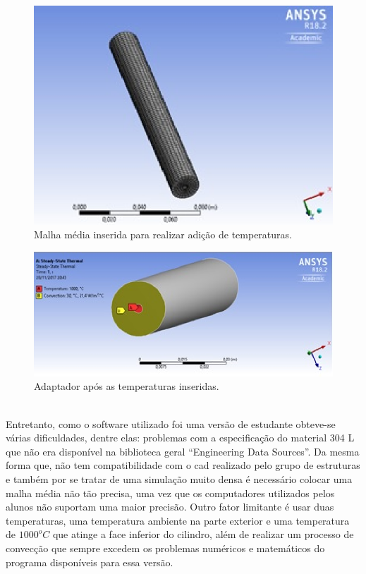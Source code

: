 \begin{figure}[!htb]                  
	\centering                          
	\includegraphics[scale=0.8]{figuras/Figura10tc.eps}
	\caption{Malha média inserida para realizar adição de temperaturas.} \label{fig10tc}              
\end{figure}
\begin{figure}[!htb]                  
	\centering                          
	\includegraphics[scale=0.8]{figuras/Figura11tc.eps}
	\caption{Adaptador após as temperaturas inseridas.} \label{fig11tc}              
\end{figure}
\\Entretanto,  como o software utilizado foi uma versão de estudante obteve-se várias dificuldades, dentre elas: problemas com a especificação do material 304 L que  não era disponível na biblioteca geral “Engineering Data Sources”. Da mesma forma que, não tem compatibilidade com o cad realizado pelo grupo de estruturas e também por se tratar de uma simulação muito densa é necessário colocar uma malha média não tão precisa, uma vez que os computadores utilizados pelos alunos não suportam uma maior precisão. Outro fator limitante é usar duas temperaturas, uma temperatura ambiente na parte exterior e uma temperatura de $1000^oC$ que atinge a face inferior do cilindro, além de realizar um processo de convecção que sempre excedem os problemas numéricos e matemáticos do programa disponíveis para essa versão.\\ 
